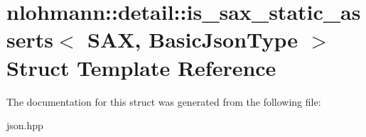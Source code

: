 \hypertarget{structnlohmann_1_1detail_1_1is__sax__static__asserts}{}\section{nlohmann\+:\+:detail\+:\+:is\+\_\+sax\+\_\+static\+\_\+asserts$<$ S\+AX, Basic\+Json\+Type $>$ Struct Template Reference}
\label{structnlohmann_1_1detail_1_1is__sax__static__asserts}


The documentation for this struct was generated from the following file\+:\begin{DoxyCompactItemize}
\item 
json.\+hpp\end{DoxyCompactItemize}
